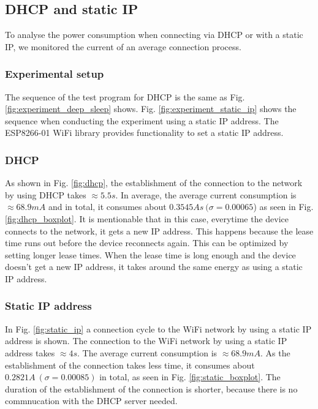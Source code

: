 \subsection{DHCP and static IP}
To analyse the power consumption when connecting via DHCP or with a static IP, we monitored the current of an average connection process.\\

\subsubsection{Experimental setup}
The sequence of the test program for DHCP is the same as Fig. \ref{fig:experiment_deep_sleep} shows.
Fig. \ref{fig:experiment_static_ip} shows the sequence when conducting the experiment using a static IP address.
The ESP8266-01 WiFi library provides functionality to set a static IP address.\\

\subsubsection{DHCP}
As shown in Fig. \ref{fig:dhcp}, the establishment of the connection to the network by using DHCP takes $\approx 5.5 s$.
In average, the average current consumption is $\approx 68.9 mA$ and in total, it consumes about $0.3545 As\ (\sigma = 0.00065$) as seen in Fig. \ref{fig:dhcp_boxplot}.
It is mentionable that in this case, everytime the device connects to the network, it gets a new IP address.
This happens because the lease time runs out before the device reconnects again.
This can be optimized by setting longer lease times.
When the lease time is long enough and the device doesn't get a new IP address, it takes around the same energy as using a static IP address.\\

\subsubsection{Static IP address}
In Fig. \ref{fig:static_ip} a connection cycle to the WiFi network by using a static IP address is shown.
The connection to the WiFi network by using a static IP address takes $\approx 4 s$.
The average current consumption is $\approx 68.9 mA$.
As the establishment of the connection takes less time, it consumes about $0.2821 A\ (\sigma = 0.00085)$  in total, as seen in Fig. \ref{fig:static_boxplot}.
The duration of the establishment of the connection is shorter, because there is no commnucation with the DHCP server needed.


